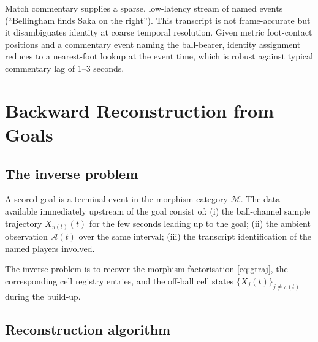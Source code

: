 \documentclass[11pt,twocolumn,a4paper]{article}
\theoremstyle{definition}
\theoremstyle{remark}
\newcommand{\Mcal}{\mathcal{M}}
\newcommand{\Acal}{\mathcal{A}}
\begin{document}
Match commentary supplies a sparse, low-latency stream of named events
(``Bellingham finds Saka on the right''). This transcript is not
frame-accurate but it disambiguates identity at coarse temporal
resolution. Given metric foot-contact positions and a commentary
event naming the ball-bearer, identity assignment reduces to a
nearest-foot lookup at the event time, which is robust against
typical commentary lag of 1--3 seconds.

\section{Backward Reconstruction from Goals}
\label{sec:backward}

\subsection{The inverse problem}

A scored goal is a terminal event in the morphism category $\Mcal$.
The data available immediately upstream of the goal consist of:
(i) the ball-channel sample trajectory
$X_{\pi(t)}(t)$ for the few seconds leading up to the goal;
(ii) the ambient observation $\Acal(t)$ over the same interval;
(iii) the transcript identification of the named players involved.

The inverse problem is to recover the morphism factorisation
\eqref{eq:gtraj}, the corresponding cell registry entries, and the
off-ball cell states $\{X_j(t)\}_{j \neq \pi(t)}$ during the build-up.

\subsection{Reconstruction algorithm}
\end{document}
